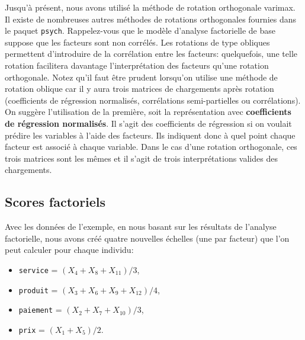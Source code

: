 \documentclass[
  11pt,
  letterpaper,
]{scrbook}
\providecommand{\tightlist}{%
  \setlength{\itemsep}{0pt}\setlength{\parskip}{0pt}}\usepackage{longtable,booktabs,array}
\theoremstyle{definition}
\theoremstyle{remark}
\begin{document}
Jusqu'à présent, nous avons utilisé la méthode de rotation orthogonale
varimax. Il existe de nombreuses autres méthodes de rotations
orthogonales fournies dans le paquet \texttt{psych}. Rappelez-vous que
le modèle d'analyse factorielle de base suppose que les facteurs sont
non corrélés. Les rotations de type obliques permettent d'introduire de
la corrélation entre les facteurs: quelquefois, une telle rotation
facilitera davantage l'interprétation des facteurs qu'une rotation
orthogonale. Notez qu'il faut être prudent lorsqu'on utilise une méthode
de rotation oblique car il y aura trois matrices de chargements après
rotation (coefficients de régression normalisés, corrélations
semi-partielles ou corrélations). On suggère l'utilisation de la
première, soit la représentation avec \textbf{coefficients de régression
normalisés}. Il s'agit des coefficients de régression si on voulait
prédire les variables à l'aide des facteurs. Ils indiquent donc à quel
point chaque facteur est associé à chaque variable. Dans le cas d'une
rotation orthogonale, ces trois matrices sont les mêmes et il s'agit de
trois interprétations valides des chargements.

\hypertarget{scores-factoriels}{%
\subsection{Scores factoriels}\label{scores-factoriels}}

Avec les données de l'exemple, en nous basant sur les résultats de
l'analyse factorielle, nous avons créé quatre nouvelles échelles (une
par facteur) que l'on peut calculer pour chaque individu:

\begin{itemize}
\tightlist
\item
  \texttt{service} = \((X_4+X_8+X_{11})/3\),
\item
  \texttt{produit} = \((X_3+X_6+X_9+X_{12})/4\),
\item
  \texttt{paiement} = \((X_2+X_7+X_{10})/3\),
\item
  \texttt{prix} = \((X_1+X_5)/2\).
\end{itemize}
\end{document}

